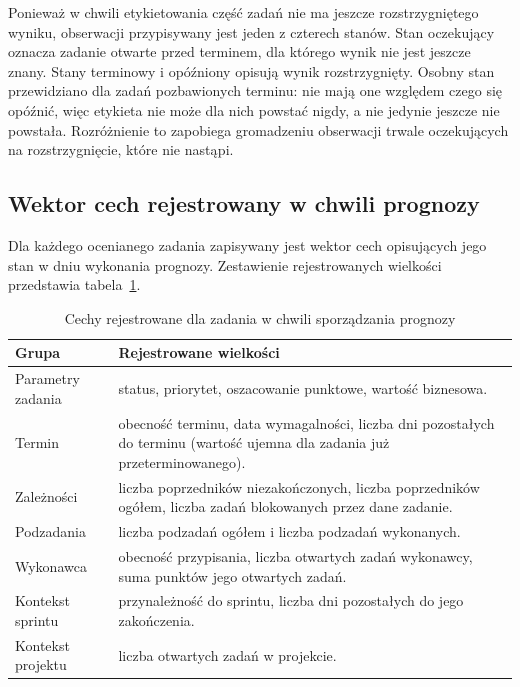 Ponieważ w chwili etykietowania część zadań nie ma jeszcze rozstrzygniętego wyniku, obserwacji przypisywany jest jeden z czterech stanów. Stan oczekujący oznacza zadanie otwarte przed terminem, dla którego wynik nie jest jeszcze znany. Stany terminowy i opóźniony opisują wynik rozstrzygnięty. Osobny stan przewidziano dla zadań pozbawionych terminu: nie mają one względem czego się opóźnić, więc etykieta nie może dla nich powstać nigdy, a nie jedynie jeszcze nie powstała. Rozróżnienie to zapobiega gromadzeniu obserwacji trwale oczekujących na rozstrzygnięcie, które nie nastąpi.

\subsection{Wektor cech rejestrowany w chwili prognozy}

Dla każdego ocenianego zadania zapisywany jest wektor cech opisujących jego stan w dniu wykonania prognozy. Zestawienie rejestrowanych wielkości przedstawia tabela~\ref{tab:cechy-modelu}.

\begin{table}[htbp]
    \centering
    \small
    \caption{Cechy rejestrowane dla zadania w chwili sporządzania prognozy}
    \label{tab:cechy-modelu}
    \begin{tabularx}{\textwidth}{@{}lX@{}}
        \toprule
        \textbf{Grupa} & \textbf{Rejestrowane wielkości} \\
        \midrule
        Parametry zadania
        & status, priorytet, oszacowanie punktowe, wartość biznesowa. \\
        \addlinespace
        Termin
        & obecność terminu, data wymagalności, liczba dni pozostałych do terminu
        (wartość ujemna dla zadania już przeterminowanego). \\
        \addlinespace
        Zależności
        & liczba poprzedników niezakończonych, liczba poprzedników ogółem,
        liczba zadań blokowanych przez dane zadanie. \\
        \addlinespace
        Podzadania
        & liczba podzadań ogółem i liczba podzadań wykonanych. \\
        \addlinespace
        Wykonawca
        & obecność przypisania, liczba otwartych zadań wykonawcy,
        suma punktów jego otwartych zadań. \\
        \addlinespace
        Kontekst sprintu
        & przynależność do sprintu, liczba dni pozostałych do jego zakończenia. \\
        \addlinespace
        Kontekst projektu
        & liczba otwartych zadań w projekcie. \\
        \bottomrule
    \end{tabularx}
\end{table}

